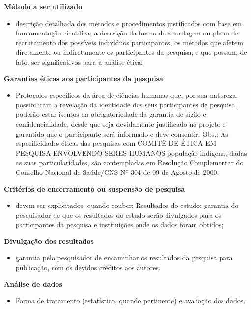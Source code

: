 \documentclass[
  brazilian,
  12pt,
  letterpaper,
  DIV=11,
  numbers=noendperiod]{scrartcl}
\providecommand{\tightlist}{%
  \setlength{\itemsep}{0pt}\setlength{\parskip}{0pt}}
\begin{document}
\textbf{Método a ser utilizado}

\begin{itemize}
\tightlist
\item
  descrição detalhada dos métodos e procedimentos justificados com base
  em fundamentação científica; a descrição da forma de abordagem ou
  plano de recrutamento dos possíveis indivíduos participantes, os
  métodos que afetem diretamente ou indiretamente os participantes da
  pesquisa, e que possam, de fato, ser significativos para a análise
  ética;
\end{itemize}

\textbf{Garantias éticas aos participantes da pesquisa}

\begin{itemize}
\tightlist
\item
  Protocolos específicos da área de ciências humanas que, por sua
  natureza, possibilitam a revelação da identidade dos seus
  participantes de pesquisa, poderão estar isentos da obrigatoriedade da
  garantia de sigilo e confidencialidade, desde que seja devidamente
  justificado no projeto e garantido que o participante será informado e
  deve consentir; Obs.: As especificidades éticas das pesquisas com
  COMITÊ DE ÉTICA EM PESQUISA ENVOLVENDO SERES HUMANOS população
  indígena, dadas as suas particularidades, são contempladas em
  Resolução Complementar do Conselho Nacional de Saúde/CNS Nº 304 de 09
  de Agosto de 2000;
\end{itemize}

\textbf{Critérios de encerramento ou suspensão de pesquisa}

\begin{itemize}
\tightlist
\item
  devem ser explicitados, quando couber; Resultados do estudo: garantia
  do pesquisador de que os resultados do estudo serão divulgados para os
  participantes da pesquisa e instituições onde os dados foram obtidos;
\end{itemize}

\textbf{Divulgação dos resultados}

\begin{itemize}
\tightlist
\item
  garantia pelo pesquisador de encaminhar os resultados da pesquisa para
  publicação, com os devidos créditos aos autores.
\end{itemize}

\textbf{Análise de dados}

\begin{itemize}
\tightlist
\item
  Forma de tratamento (estatístico, quando pertinente) e avaliação dos
  dados.
\end{itemize}
\end{document}

